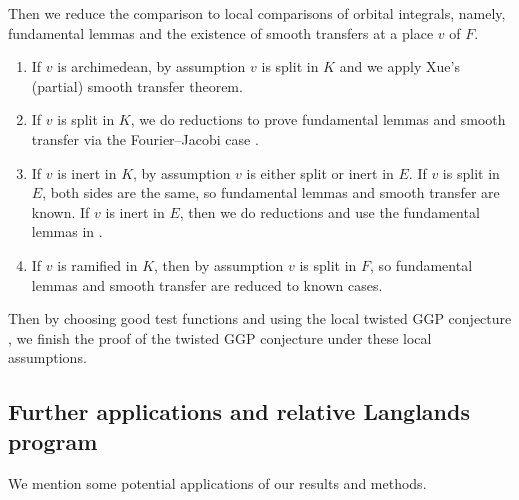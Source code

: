 \documentclass[11pt, reqno]{amsart}
\numberwithin{equation}{subsection}
\theoremstyle{plain}
\theoremstyle{definition}
\begin{document}
Then we reduce the comparison to local comparisons of orbital integrals, namely, fundamental lemmas and the existence of smooth transfers at a place $v$ of $F$. 
\begin{enumerate}
\item If $v$ is archimedean, by assumption $v$ is split in $K$ and we apply Xue's     (partial) smooth transfer theorem.
\item If $v$ is split in $K$, we do reductions to prove fundamental lemmas and smooth transfer via the Fourier--Jacobi case \cite{Xue-GGP}. 
\item If $v$ is inert in $K$, by assumption $v$ is either split or inert in $E$. If $v$ is split in $E$, both sides are the same, so fundamental lemmas and smooth transfer are known. If $v$ is inert in $E$, then we do reductions and use the fundamental lemmas in \cite{TGGP-Wang}.
\item If $v$ is ramified in $K$, then by assumption $v$ is split in $F$, so fundamental lemmas and smooth transfer are reduced to known cases.
\end{enumerate}

Then by choosing good test functions and using the local twisted GGP conjecture \cite{le2025local}, we finish the proof of the twisted GGP conjecture under these local assumptions. 




\subsection{Further applications and relative Langlands program}

We mention some potential applications of our results and methods.
\end{document}
